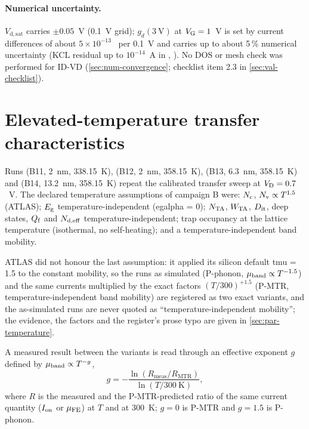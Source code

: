 \paragraph{Numerical uncertainty.} $V_{\mathrm{d,sat}}$ carries $\pm 0.05$~V (0.1~V grid); $g_d(3~\mathrm{V})$ at $V_{\mathrm{G}} = 1$~V is set by current differences of about $5\times10^{-13}$~\Aum{} per 0.1~V and carries up to about 5\,\% numerical uncertainty (KCL residual up to $10^{-14}$~A in , ). No DOS or mesh check was performed for ID-VD (\cref{sec:num-convergence}; checklist item 2.3 in \cref{sec:val-checklist}).

\section{Elevated-temperature transfer characteristics}\label{sec:pred-temperature}

Runs  (B11, 2~nm, 338.15~K),  (B12, 2~nm, 358.15~K),  (B13, 6.3~nm, 358.15~K) and  (B14, 13.2~nm, 358.15~K) repeat the calibrated transfer sweep at $V_{\mathrm{D}} = 0.7$~V. The declared temperature assumptions of campaign B were: $N_{\mathrm{c}}$, $N_{\mathrm{v}} \propto T^{1.5}$ (ATLAS); $E_{\mathrm{g}}$ temperature-independent (egalpha = 0); $N_{\mathrm{TA}}$, $W_{\mathrm{TA}}$, $D_{\mathrm{it}}$, deep states, $Q_{\mathrm{f}}$ and $N_{\mathrm{d,eff}}$ temperature-independent; trap occupancy at the lattice temperature (isothermal, no self-heating); and a temperature-independent band mobility.

\begin{caveat}[title={The tmu caveat}]
ATLAS did not honour the last assumption: it applied its silicon default tmu = 1.5 to the constant mobility, so the runs as simulated (P-phonon, $\mu_{\mathrm{band}}\propto T^{-1.5}$) and the same currents multiplied by the exact factors $(T/300)^{+1.5}$ (P-MTR, temperature-independent band mobility) are registered as two exact variants, and the as-simulated runs are never quoted as ``temperature-independent mobility''; the evidence, the factors and the register's prose typo are given in \cref{sec:par-temperature}.
\end{caveat}

A measured result between the variants is read through an effective exponent $g$ defined by $\mu_{\mathrm{band}}\propto T^{-g}$,
\begin{equation}
  g = -\frac{\ln(R_{\mathrm{meas}}/R_{\mathrm{MTR}})}{\ln(T/300~\mathrm{K})},\label{eq:pred-g}
\end{equation}
where $R$ is the measured and the P-MTR-predicted ratio of the same current quantity ($I_{\mathrm{on}}$ or $\mu_{\mathrm{FE}}$) at $T$ and at 300~K; $g = 0$ is P-MTR and $g = 1.5$ is P-phonon.

